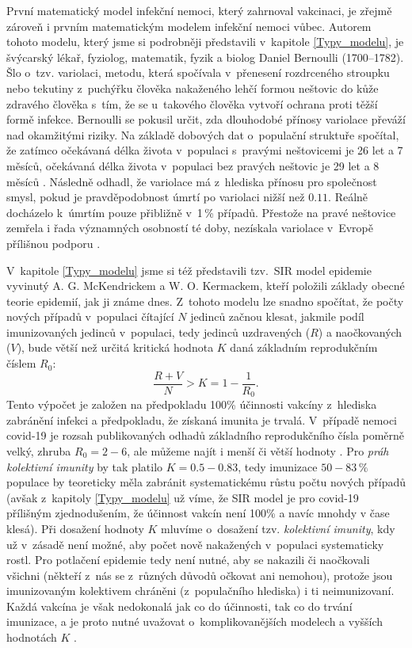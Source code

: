 První matematický model infekční nemoci, který zahrnoval vakcinaci, je zřejmě zároveň i prvním matematickým modelem infekční nemoci vůbec. Autorem tohoto modelu, který jsme si podrobněji představili v~kapitole \ref{Typy_modelu}, je švýcarský lékař, fyziolog, matematik, fyzik a biolog Daniel Bernoulli (1700--1782). Šlo o~tzv. variolaci, metodu, která spočívala v~přenesení rozdrceného stroupku nebo tekutiny z~puchýřku člověka nakaženého lehčí formou neštovic do kůže zdravého člověka s~tím, že se u~takového člověka vytvoří ochrana proti těžší formě infekce. Bernoulli se pokusil určit, zda dlouhodobé přínosy variolace převáží nad okamžitými riziky. Na základě dobových dat o~populační struktuře spočítal, že zatímco očekávaná délka života v~populaci s~pravými neštovicemi je 26 let a 7 měsíců, očekávaná délka života v~populaci bez pravých neštovic je 29 let a 8 měsíců \cite{Bacaer2011}. Následně odhadl, že variolace má z~hlediska přínosu pro společnost smysl, pokud je pravděpodobnost úmrtí po variolaci nižší než $0.11$. Reálně docházelo k~úmrtím pouze přibližně v~1\,\% případů. Přestože na pravé neštovice zemřela i řada významných osobností té doby, nezískala variolace v~Evropě přílišnou podporu \cite{Bacaer2011}.

V~kapitole \ref{Typy_modelu} jsme si též představili tzv.\ SIR model epidemie vyvinutý A. G. McKendrickem a W. O. Kermackem, kteří položili základy obecné teorie epidemií, jak ji známe dnes. Z~tohoto modelu lze snadno spočítat, že počty nových případů v~populaci čítající $N$ jedinců začnou klesat, jakmile podíl imunizovaných jedinců v~populaci, tedy jedinců uzdravených ($R$) a naočkovaných ($V$), bude větší než určitá kritická hodnota $K$ daná základním reprodukčním číslem $R_0$:
\begin{equation}
\frac{R+V}{N} > K = 1-\frac{1}{R_0}.
\end{equation}
Tento výpočet je založen na předpokladu 100\% účinnosti vakcíny z~hlediska zabránění infekci a předpokladu, že získaná imunita je trvalá. V~případě nemoci covid-19 je rozsah publikovaných odhadů základního reprodukčního čísla poměrně velký, zhruba $R_0 = 2-6$, ale můžeme najít i menší či větší hodnoty \cite[a uvnitř citované reference]{Billah_etal2020,Locatelli_etal2021}. Pro \emph{práh kolektivní imunity} by tak platilo $K = 0.5-0.83$, tedy imunizace $50-83\,\%$ populace by teoreticky měla zabránit systematickému růstu počtu nových případů (avšak z~kapitoly \ref{Typy_modelu} už víme, že SIR model je pro covid-19 přílišným zjednodušením, že účinnost vakcín není 100\% a navíc mnohdy v čase klesá). Při dosažení hodnoty $K$ mluvíme o~dosažení tzv. \emph{kolektivní imunity}, kdy už v~zásadě není možné, aby počet nově nakažených v~populaci systematicky rostl. Pro potlačení epidemie tedy není nutné, aby se nakazili či naočkovali všichni (někteří z~nás se z~různých důvodů očkovat ani nemohou), protože jsou imunizovaným kolektivem chráněni (z~populačního hlediska) i ti neimunizovaní. Každá vakcína je však nedokonalá jak co do účinnosti, tak co do trvání imunizace, a je proto nutné uvažovat o~komplikovanějších modelech a vyšších hodnotách $K$ \cite{K1,K2}.

